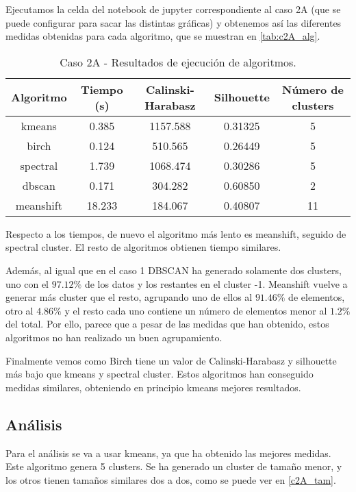 Ejecutamos la celda del notebook de jupyter correspondiente al caso 2A (que se puede configurar para sacar las distintas gráficas) y obtenemos así las diferentes medidas obtenidas para cada algoritmo, que se muestran en \eqref{tab:c2A_alg}.

\begin{table}[H]
\centering
\caption{Caso 2A - Resultados de ejecución de algoritmos.}
\label{tab:c2A_alg}
\begin{tabular}{ccccc}
\toprule
 Algoritmo & Tiempo (s) & Calinski-Harabasz & Silhouette & Número de clusters \\
\midrule
kmeans & 0.385 & 1157.588 & 0.31325 & 5 \\
birch & 0.124 & 510.565 & 0.26449 & 5 \\
spectral & 1.739 & 1068.474 & 0.30286 & 5 \\
dbscan & 0.171 & 304.282 & 0.60850 & 2 \\
meanshift & 18.233 & 184.067 & 0.40807 & 11 \\
\bottomrule
\end{tabular}
\end{table}

Respecto a los tiempos, de nuevo el algoritmo más lento es meanshift, seguido de spectral cluster. El resto de algoritmos obtienen tiempo similares.

Además, al igual que en el caso 1 DBSCAN ha generado solamente dos clusters, uno con el $97.12\%$ de los datos y los restantes en el cluster -1. Meanshift vuelve a generar más cluster que el resto, agrupando uno de ellos al $91.46\%$ de elementos, otro al $4.86\%$ y el resto cada uno contiene un número de elementos menor al $1.2\%$ del total. Por ello, parece que a pesar de las medidas que han obtenido, estos algoritmos no han realizado un buen agrupamiento.

Finalmente vemos como Birch tiene un valor de Calinski-Harabasz y silhouette más bajo que kmeans y spectral cluster. Estos algoritmos han conseguido medidas similares, obteniendo en principio kmeans mejores resultados.


\subsection{Análisis}


Para el análisis se va a usar kmeans, ya que ha obtenido las mejores medidas. Este algoritmo genera 5 clusters. Se ha generado un cluster de tamaño menor, y los otros tienen tamaños similares dos a dos, como se puede ver en \eqref{c2A_tam}.

